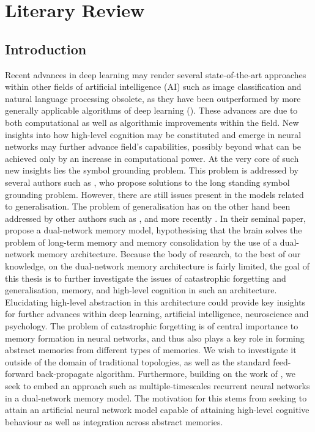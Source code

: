 
\chapter{Literary Review}
\section{Introduction}

Recent advances in deep learning may render several state-of-the-art approaches within other fields of artificial intelligence (AI) such as image classification and natural language processing obsolete, as they have been outperformed by more generally applicable algorithms of deep learning (\cite{LeCun2015, Schmidhuber2014}). These advances are due to both computational as well as algorithmic improvements within the field. New insights into how high-level cognition may be constituted and emerge in neural networks may further advance field's capabilities, possibly beyond what can be achieved only by an increase in computational power. At the very core of such new insights lies the symbol grounding problem. This problem is addressed by several authors such as \cite{Yamashita2008, Tani2014}, who propose solutions to the long standing symbol grounding problem. However, there are still issues present in the models related to generalisation. The problem of generalisation has on the other hand been addressed by other authors such as \cite{McClelland1995}, and more recently \cite{Hattori2014}. In their seminal paper, \cite{McClelland1995} propose a dual-network memory model, hypothesising that the brain solves the problem of long-term memory and memory consolidation by the use of a dual-network memory architecture. Because the body of research, to the best of our knowledge, on the dual-network memory architecture is fairly limited, the goal of this thesis is to further investigate the issues of catastrophic forgetting and generalisation, memory, and high-level cognition in such an architecture. Elucidating high-level abstraction in this architecture could provide key insights for further advances within deep learning, artificial intelligence, neuroscience and psychology. The problem of catastrophic forgetting is of central importance to memory formation in neural networks, and thus also plays a key role in forming abstract memories from different types of memories. We wish to investigate it outside of the domain of traditional topologies, as well as the standard feed-forward back-propagate algorithm. Furthermore, building on the work of \cite{Hattori2014}, we seek to embed an approach such as multiple-timescales recurrent neural networks in a dual-network memory model. The motivation for this stems from seeking to attain an artificial neural network model capable of attaining high-level cognitive behaviour as well as integration across abstract memories.
